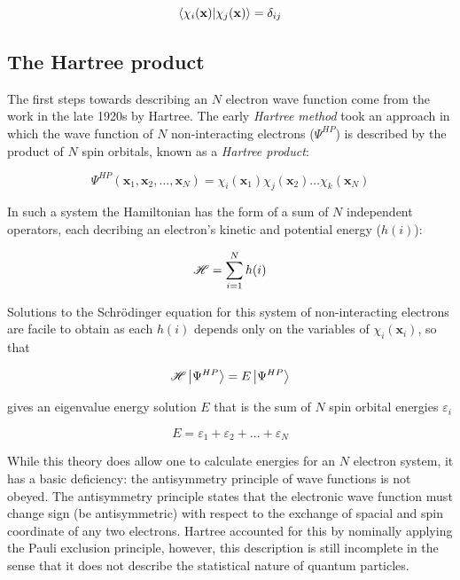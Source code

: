 \begin{equation}
\bra{\chi_i(\mathbf{x})}\ket{\chi_j(\mathbf{x})} = \delta_{ij}
\end{equation}

\subsection{The Hartree product}

The first steps towards describing an $N$ electron wave function come from the work in the late 1920s by Hartree. The early \emph{Hartree method} took an approach in which the wave function of $N$ non-interacting electrons ($\Psi^{HP}$) is described by the product of $N$ spin orbitals, known as a \emph{Hartree product}:

\begin{equation}
\Psi^{HP}(\mathbf{x}_1,\mathbf{x}_2,\ldots,\mathbf{x}_N) = \chi_i(\mathbf{x}_1)\chi_j(\mathbf{x}_2)\dots\chi_k(\mathbf{x}_N)
\end{equation}

\noindent In such a system the Hamiltonian has the form of a sum of $N$ independent operators, each decribing an electron's kinetic and potential energy ($h(i)$):

\begin{equation}
  \mathscr{H} = \sum_{i=1}^N h(i)
\end{equation}

Solutions to the Schr{\"o}dinger equation for this system of non-interacting electrons are facile to obtain as each $h(i)$ depends only on the variables of $\chi_i(\mathbf{x}_i)$, so that

\begin{equation}
  \mathscr{H} \ket{\Psi^{HP}} = E \ket{\Psi^{HP}}
\end{equation}

\noindent gives an eigenvalue energy solution $E$ that is the sum of $N$ spin orbital energies $\varepsilon_i$

\begin{equation}
E = \varepsilon_1 + \varepsilon_2 + \dots + \varepsilon_N
\end{equation}

While this theory does allow one to calculate energies for an $N$ electron system, it has a basic deficiency: the antisymmetry principle of wave functions is not obeyed. The antisymmetry principle states that the electronic wave function must change sign (be antisymmetric) with respect to the exchange of spacial and spin coordinate of any two electrons. Hartree accounted for this by nominally applying the Pauli exclusion principle, however, this description is still incomplete in the sense that it does not describe the statistical nature of quantum particles.

